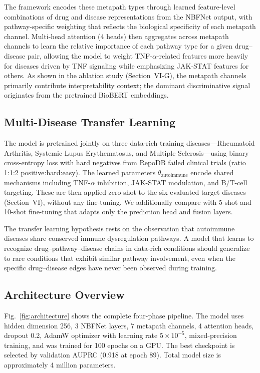 \documentclass[conference]{IEEEtran}
\begin{document}
The framework encodes these metapath types through learned feature-level combinations of drug and disease representations from the NBFNet output, with pathway-specific weighting that reflects the biological specificity of each metapath channel. Multi-head attention (4 heads) then aggregates across metapath channels to learn the relative importance of each pathway type for a given drug--disease pair, allowing the model to weight TNF-$\alpha$-related features more heavily for diseases driven by TNF signaling while emphasizing JAK-STAT features for others. As shown in the ablation study (Section~VI-G), the metapath channels primarily contribute interpretability context; the dominant discriminative signal originates from the pretrained BioBERT embeddings.

\subsection{Multi-Disease Transfer Learning}

The model is pretrained jointly on three data-rich training diseases---Rheumatoid Arthritis, Systemic Lupus Erythematosus, and Multiple Sclerosis---using binary cross-entropy loss with hard negatives from RepoDB failed clinical trials (ratio 1:1:2 positive:hard:easy). The learned parameters $\theta_{\text{autoimmune}}$ encode shared mechanisms including TNF-$\alpha$ inhibition, JAK-STAT modulation, and B/T-cell targeting. These are then applied zero-shot to the six evaluated target diseases (Section~VI), without any fine-tuning. We additionally compare with 5-shot and 10-shot fine-tuning that adapts only the prediction head and fusion layers.

The transfer learning hypothesis rests on the observation that autoimmune diseases share conserved immune dysregulation pathways. A model that learns to recognize drug--pathway--disease chains in data-rich conditions should generalize to rare conditions that exhibit similar pathway involvement, even when the specific drug--disease edges have never been observed during training.

\subsection{Architecture Overview}

Fig.~\ref{fig:architecture} shows the complete four-phase pipeline. The model uses hidden dimension 256, 3 NBFNet layers, 7 metapath channels, 4 attention heads, dropout 0.2, AdamW optimizer with learning rate $5 \times 10^{-5}$, mixed-precision training, and was trained for 100 epochs on a GPU. The best checkpoint is selected by validation AUPRC (0.918 at epoch 89). Total model size is approximately 4 million parameters.
\end{document}
